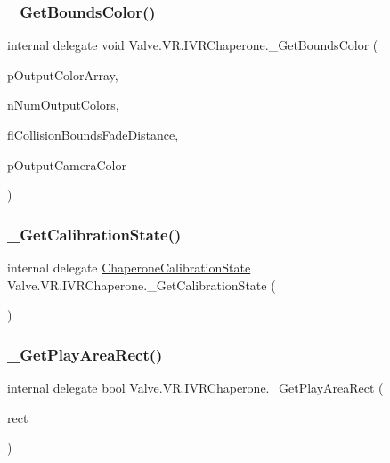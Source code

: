 \subsubsection{\texorpdfstring{\_GetBoundsColor()}{\_GetBoundsColor()}}
{\footnotesize\ttfamily internal delegate void Valve.\+V\+R.\+I\+V\+R\+Chaperone.\+\_\+\+Get\+Bounds\+Color (\begin{DoxyParamCaption}\item[{ref \mbox{\hyperlink{struct_valve_1_1_v_r_1_1_hmd_color__t}{Hmd\+Color\+\_\+t}}}]{p\+Output\+Color\+Array,  }\item[{int}]{n\+Num\+Output\+Colors,  }\item[{float}]{fl\+Collision\+Bounds\+Fade\+Distance,  }\item[{ref \mbox{\hyperlink{struct_valve_1_1_v_r_1_1_hmd_color__t}{Hmd\+Color\+\_\+t}}}]{p\+Output\+Camera\+Color }\end{DoxyParamCaption})}

\mbox{\label{struct_valve_1_1_v_r_1_1_i_v_r_chaperone_ae940ed5f0954e57503fd3c59e6a52bbd}} 
\subsubsection{\texorpdfstring{\_GetCalibrationState()}{\_GetCalibrationState()}}
{\footnotesize\ttfamily internal delegate \mbox{\hyperlink{namespace_valve_1_1_v_r_ab893e8e2bf198a8cb4d2a2cd9c545c32}{Chaperone\+Calibration\+State}} Valve.\+V\+R.\+I\+V\+R\+Chaperone.\+\_\+\+Get\+Calibration\+State (\begin{DoxyParamCaption}{ }\end{DoxyParamCaption})}

\mbox{\label{struct_valve_1_1_v_r_1_1_i_v_r_chaperone_a489fd7799318412b5ecf95dba2dadc6a}} 
\subsubsection{\texorpdfstring{\_GetPlayAreaRect()}{\_GetPlayAreaRect()}}
{\footnotesize\ttfamily internal delegate bool Valve.\+V\+R.\+I\+V\+R\+Chaperone.\+\_\+\+Get\+Play\+Area\+Rect (\begin{DoxyParamCaption}\item[{ref \mbox{\hyperlink{struct_valve_1_1_v_r_1_1_hmd_quad__t}{Hmd\+Quad\+\_\+t}}}]{rect }\end{DoxyParamCaption})}

